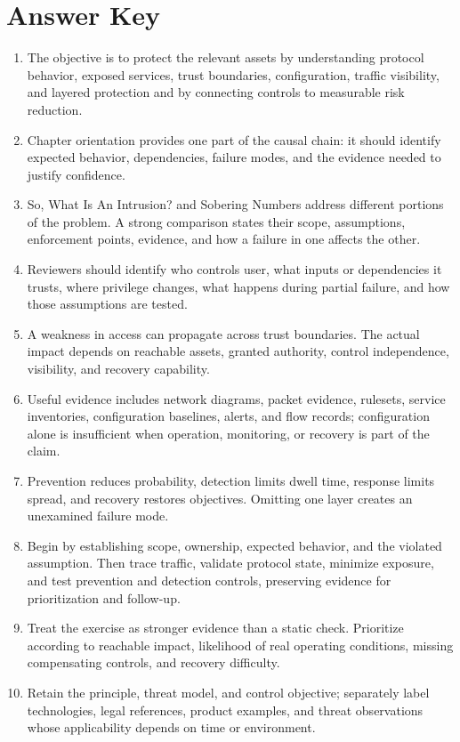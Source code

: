 \documentclass[11pt]{article}
\begin{document}
\section*{Answer Key}
\begin{enumerate}
\item The objective is to protect the relevant assets by understanding protocol behavior, exposed services, trust boundaries, configuration, traffic visibility, and layered protection and by connecting controls to measurable risk reduction.
\item Chapter orientation provides one part of the causal chain: it should identify expected behavior, dependencies, failure modes, and the evidence needed to justify confidence.
\item So, What Is An Intrusion? and Sobering Numbers address different portions of the problem. A strong comparison states their scope, assumptions, enforcement points, evidence, and how a failure in one affects the other.
\item Reviewers should identify who controls user, what inputs or dependencies it trusts, where privilege changes, what happens during partial failure, and how those assumptions are tested.
\item A weakness in access can propagate across trust boundaries. The actual impact depends on reachable assets, granted authority, control independence, visibility, and recovery capability.
\item Useful evidence includes network diagrams, packet evidence, rulesets, service inventories, configuration baselines, alerts, and flow records; configuration alone is insufficient when operation, monitoring, or recovery is part of the claim.
\item Prevention reduces probability, detection limits dwell time, response limits spread, and recovery restores objectives. Omitting one layer creates an unexamined failure mode.
\item Begin by establishing scope, ownership, expected behavior, and the violated assumption. Then trace traffic, validate protocol state, minimize exposure, and test prevention and detection controls, preserving evidence for prioritization and follow-up.
\item Treat the exercise as stronger evidence than a static check. Prioritize according to reachable impact, likelihood of real operating conditions, missing compensating controls, and recovery difficulty.
\item Retain the principle, threat model, and control objective; separately label technologies, legal references, product examples, and threat observations whose applicability depends on time or environment.
\end{enumerate}
\end{document}
